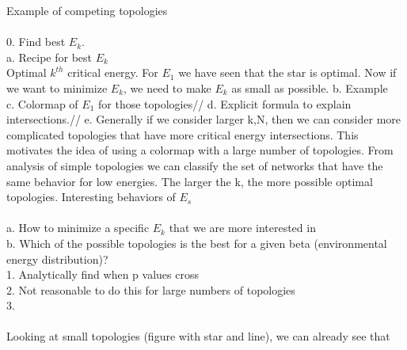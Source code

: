 \documentclass{amsart}
\theoremstyle{plain}
\numberwithin{equation}{section}
\begin{document}
Example of competing topologies\\
\\
0. Find best $E_k$. \\
  a. Recipe for best $E_k$\\
	Optimal $k^{th}$ critical energy. For $E_1$ we have seen that the star is optimal. Now if we want to minimize $E_k$, we need to make $E_k$ as small as possible.
  b. Example\\
	c. Colormap of $E_1$ for those topologies//
	d. Explicit formula to explain intersections.//
	e. Generally if we consider larger k,N, then we can consider more complicated topologies that have more critical energy intersections. This motivates the idea of using a colormap with a large number of topologies.
From analysis of simple topologies we can classify the set of networks that have the same behavior for low energies. The larger the k, the more possible optimal topologies. Interesting behaviors of $E_s$
\\
\\
 a. How to minimize a specific $E_k$ that we are more interested in\\
 b. Which of the possible topologies is the best for a given beta (environmental energy distribution)?\\
1. Analytically find when p values cross\\
2. Not reasonable to do this for large numbers of topologies\\
3.\\ 
\\
Looking at small topologies (figure with star and line), we can already see that 
\end{document}
